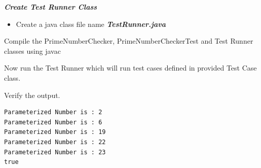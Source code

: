 \documentclass[11pt,a4paper]{article}
\begin{document}


\emph{\textbf{Create Test Runner Class}}
\begin{itemize}
\item Create a java class file name \emph{\textbf{TestRunner.java }}
\end{itemize}



Compile the PrimeNumberChecker, PrimeNumberCheckerTest and Test Runner classes using javac

Now run the Test Runner which will run test cases defined in provided Test Case class.

Verify the output.
\begin{lstlisting}[numbers=none]
Parameterized Number is : 2
Parameterized Number is : 6
Parameterized Number is : 19
Parameterized Number is : 22
Parameterized Number is : 23
true
\end{lstlisting}
\end{document}
